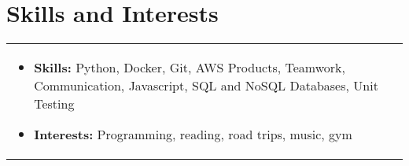\documentclass[a4paper,8pt]{article}
\begin{document}
\section{Skills and Interests}
\begin{tabularx}{\linewidth}{ @{}l r@{} }
\begin{minipage}[t]{\linewidth}
    \begin{itemize}[nosep,after=\strut, leftmargin=2em, itemsep=2pt]
        \item \textbf{Skills:} Python, Docker, Git, AWS Products, Teamwork, Communication, Javascript, SQL and NoSQL Databases, Unit Testing
        \item \textbf{Interests:} Programming, reading, road trips, music, gym
    \end{itemize}
\end{minipage}
\end{tabularx}

\end{document}
